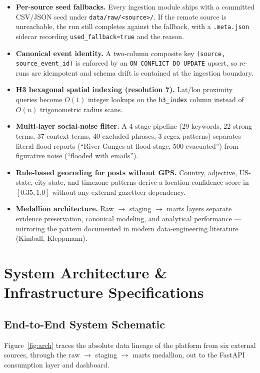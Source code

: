 \documentclass[11pt,a4paper]{article}
\begin{document}
\begin{itemize}
    \item \textbf{Per-source seed fallbacks.} Every ingestion module ships
    with a committed CSV/JSON seed under \texttt{data/raw/<source>/}. If the
    remote source is unreachable, the run still completes against the
    fallback, with a \texttt{.meta.json} sidecar recording
    \texttt{used\_fallback=true} and the reason.
    \item \textbf{Canonical event identity.} A two-column composite key
    \texttt{(source, source\_event\_id)} is enforced by an
    \texttt{ON CONFLICT DO UPDATE} upsert, so re-runs are idempotent and
    schema drift is contained at the ingestion boundary.
    \item \textbf{H3 hexagonal spatial indexing (resolution 7).} Lat/lon
    proximity queries become $O(1)$ integer lookups on the
    \texttt{h3\_index} column instead of $O(n)$ trigonometric radius scans.
    \item \textbf{Multi-layer social-noise filter.} A 4-stage pipeline (29
    keywords, 22 strong terms, 37 context terms, 40 excluded phrases, 3
    regex patterns) separates literal flood reports (``River Ganges at flood
    stage, 500 evacuated'') from figurative noise (``flooded with emails'').
    \item \textbf{Rule-based geocoding for posts without GPS.} Country,
    adjective, US-state, city-state, and timezone patterns derive a
    location-confidence score in $[0.35, 1.0]$ without any external
    gazetteer dependency.
    \item \textbf{Medallion architecture.} Raw $\to$ staging $\to$ marts
    layers separate evidence preservation, canonical modeling, and
    analytical performance --- mirroring the pattern documented in modern
    data-engineering literature (Kimball, Kleppmann).
\end{itemize}

\section{System Architecture \& Infrastructure Specifications}

\subsection{End-to-End System Schematic}

Figure~\ref{fig:arch} traces the absolute data lineage of the platform from
six external sources, through the raw $\to$ staging $\to$ marts medallion,
out to the FastAPI consumption layer and dashboard.
\end{document}
